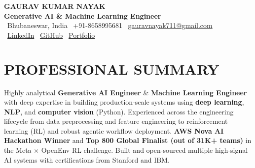 \documentclass[letterpaper,9pt]{extarticle}
\begin{document}
\begin{center}
    \textbf{\Huge GAURAV KUMAR NAYAK} \\ \vspace{2pt}
    \large\textbf{Generative AI \& Machine Learning Engineer} \\ \vspace{3pt}
    \small
    \faMapMarker*~Bhubaneswar, India \quad
    \faPhone*~+91-8658995681 \quad
    \faEnvelope~\href{mailto:gauravnayak711@gmail.com}{gauravnayak711@gmail.com} \\ \vspace{2pt}
    \faLinkedin~\href{https://www.linkedin.com/in/gaurav-kumar-nayak-b64612371/}{LinkedIn} \quad
    \faGithub~\href{https://github.com/Gaurav711cgu}{GitHub} \quad
    \faGlobe~\href{https://gaurav-portfolio-iycu.vercel.app/}{Portfolio}
\end{center}
\vspace{-12pt}

\section{PROFESSIONAL SUMMARY}
\small{
Highly analytical \textbf{Generative AI Engineer} \& \textbf{Machine Learning Engineer} with deep expertise in building production-scale systems using \textbf{deep learning}, \textbf{NLP}, and \textbf{computer vision} (Python). Experienced across the engineering lifecycle from data preprocessing and feature engineering to reinforcement learning (RL) and robust agentic workflow deployment. \textbf{AWS Nova AI Hackathon Winner} and \textbf{Top 800 Global Finalist (out of 31K+ teams)} in the Meta $\times$ OpenEnv RL challenge. Built and open-sourced multiple high-signal AI systems with certifications from Stanford and IBM.
}
\vspace{-4pt}

\end{document}
